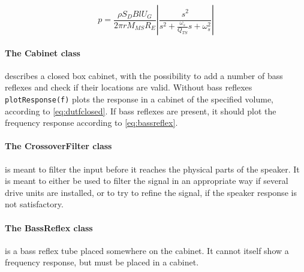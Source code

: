 \begin{equation}
	p = \frac{\rho S_D B l U_G}{2\pi r M_{MS} R_E}\left|\frac{s^2}{s^2 + \frac{\omega_s}{Q_{TS}}s+\omega_s^2}\right|
	\label{eq:transdriveunit}
\end{equation}

\paragraph{The Cabinet class} describes a closed box cabinet, with the possibility to add a number of bass reflexes and check if their locations are valid.
Without bass reflexes \texttt{plotResponse(f)} plots the response in a cabinet of the specified volume, according to \cref{eq:dutfclosed}.
If bass reflexes are present, it should plot the frequency response according to \cref{eq:bassreflex}.

\paragraph{The CrossoverFilter class} is meant to filter the input before it reaches the physical parts of the speaker.
It is meant to either be used to filter the signal in an appropriate way if several drive units are installed, or to try to refine the signal, if the speaker response is not satisfactory.

\paragraph{The BassReflex class} is a bass reflex tube placed somewhere on the cabinet.
It cannot itself show a frequency response, but must be placed in a cabinet.